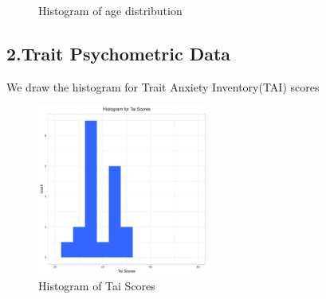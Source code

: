 \documentclass[12pt,epsf]{report}
\begin{document}
{\begin{figure}[!htb]
\begin{minipage}[c]{0.5\linewidth}
	\caption{Histogram of age distribution}
	\end{minipage}
\end{figure}
\FloatBarrier
\subsection*{2.Trait Psychometric Data}
We draw the histogram for Trait Anxiety Inventory(TAI) scores\\
\begin{figure}[!htb]
	\centering
	\includegraphics[width=0.5\textwidth]{tai_plot.pdf}
	\caption{Histogram of Tai Scores}
	\centering
\end{figure}
\FloatBarrier
}
\end{document}
